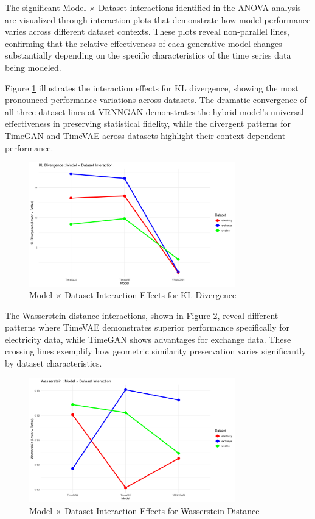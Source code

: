 \documentclass{article}
\begin{document}
The significant Model × Dataset interactions identified in the ANOVA analysis are visualized through interaction plots that demonstrate how model performance varies across different dataset contexts. These plots reveal non-parallel lines, confirming that the relative effectiveness of each generative model changes substantially depending on the specific characteristics of the time series data being modeled.

Figure \ref{fig:kl_interaction} illustrates the interaction effects for KL divergence, showing the most pronounced performance variations across datasets. The dramatic convergence of all three dataset lines at VRNNGAN demonstrates the hybrid model's universal effectiveness in preserving statistical fidelity, while the divergent patterns for TimeGAN and TimeVAE across datasets highlight their context-dependent performance.

\begin{figure}[H]
\centering
\includegraphics[width=0.8\textwidth]{assets/interaction_kl.png}
\caption{Model × Dataset Interaction Effects for KL Divergence}
\label{fig:kl_interaction}
\end{figure}

The Wasserstein distance interactions, shown in Figure \ref{fig:wasserstein_interaction}, reveal different patterns where TimeVAE demonstrates superior performance specifically for electricity data, while TimeGAN shows advantages for exchange data. These crossing lines exemplify how geometric similarity preservation varies significantly by dataset characteristics.

\begin{figure}[H]
\centering
\includegraphics[width=0.8\textwidth]{assets/interaction_wasserstein.png}
\caption{Model × Dataset Interaction Effects for Wasserstein Distance}
\label{fig:wasserstein_interaction}
\end{figure}
\end{document}

